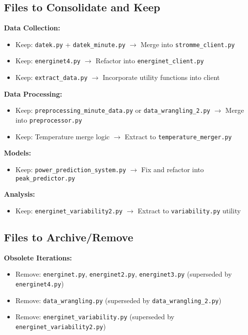 \documentclass[11pt,a4paper]{article}
\begin{document}
\subsection{Files to Consolidate and Keep}

\textbf{Data Collection:}
\begin{itemize}
    \item Keep: \texttt{datek.py} + \texttt{datek\_minute.py} $\rightarrow$ Merge into \texttt{stromme\_client.py}
    \item Keep: \texttt{energinet4.py} $\rightarrow$ Refactor into \texttt{energinet\_client.py}
    \item Keep: \texttt{extract\_data.py} $\rightarrow$ Incorporate utility functions into client
\end{itemize}

\textbf{Data Processing:}
\begin{itemize}
    \item Keep: \texttt{preprocessing\_minute\_data.py} or \texttt{data\_wrangling\_2.py} $\rightarrow$ Merge into \texttt{preprocessor.py}
    \item Keep: Temperature merge logic $\rightarrow$ Extract to \texttt{temperature\_merger.py}
\end{itemize}

\textbf{Models:}
\begin{itemize}
    \item Keep: \texttt{power\_prediction\_system.py} $\rightarrow$ Fix and refactor into \texttt{peak\_predictor.py}
\end{itemize}

\textbf{Analysis:}
\begin{itemize}
    \item Keep: \texttt{energinet\_variability2.py} $\rightarrow$ Extract to \texttt{variability.py} utility
\end{itemize}

\subsection{Files to Archive/Remove}

\textbf{Obsolete Iterations:}
\begin{itemize}
    \item Remove: \texttt{energinet.py}, \texttt{energinet2.py}, \texttt{energinet3.py} (superseded by \texttt{energinet4.py})
    \item Remove: \texttt{data\_wrangling.py} (superseded by \texttt{data\_wrangling\_2.py})
    \item Remove: \texttt{energinet\_variability.py} (superseded by \texttt{energinet\_variability2.py})
\end{itemize}
\end{document}
